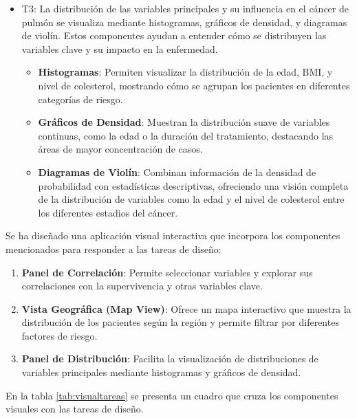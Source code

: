 \documentclass[10pt,journal,compsoc]{IEEEtran}
\begin{document}
\begin{itemize}
\item T3:
La distribución de las variables principales y su influencia en el cáncer de pulmón se visualiza mediante histogramas, gráficos de densidad, y diagramas de violín. Estos componentes ayudan a entender cómo se distribuyen las variables clave y su impacto en la enfermedad.

\begin{itemize}
    \item \textbf{Histogramas}: Permiten visualizar la distribución de la edad, BMI, y nivel de colesterol, mostrando cómo se agrupan los pacientes en diferentes categorías de riesgo.
    \item \textbf{Gráficos de Densidad}: Muestran la distribución suave de variables continuas, como la edad o la duración del tratamiento, destacando las áreas de mayor concentración de casos.
    \item \textbf{Diagramas de Violín}: Combinan información de la densidad de probabilidad con estadísticas descriptivas, ofreciendo una visión completa de la distribución de variables como la edad y el nivel de colesterol entre los diferentes estadios del cáncer.
\end{itemize}

\end{itemize}

Se ha diseñado una aplicación visual interactiva que incorpora los componentes mencionados para responder a las tareas de diseño:

\begin{enumerate}
    \item \textbf{Panel de Correlación}: Permite seleccionar variables y explorar sus correlaciones con la supervivencia y otras variables clave.
    \item \textbf{Vista Geográfica (Map View)}: Ofrece un mapa interactivo que muestra la distribución de los pacientes según la región y permite filtrar por diferentes factores de riesgo.
    \item \textbf{Panel de Distribución}: Facilita la visualización de distribuciones de variables principales mediante histogramas y gráficos de densidad.
\end{enumerate}

En la tabla \ref{tab:visualtareas} se presenta un cuadro que cruza los componentes visuales con las tareas de diseño. 
\end{document}
